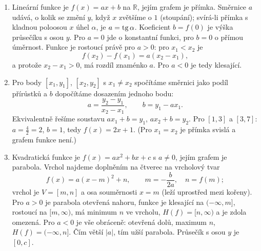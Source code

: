 \begin{enumerate}[label=\textbf{\arabic*.}, leftmargin=*, itemsep=0.8em]
  \item {}
  Lineární funkce je $f(x) = ax + b$ na $\mathbb{R}$, jejím grafem je přímka. Směrnice $a$ udává, o kolik se změní $y$, když $x$ zvětšíme o $1$ (stoupání); svírá-li přímka s kladnou poloosou $x$ úhel $\alpha$, je $a = \operatorname{tg}\alpha$. Koeficient $b = f(0)$ je výška průsečíku s osou $y$. Pro $a = 0$ jde o konstantní funkci, pro $b = 0$ o přímou úměrnost. Funkce je rostoucí právě pro $a > 0$: pro $x_1 < x_2$ je
  \begin{equation*}
    f(x_2) - f(x_1) = a(x_2 - x_1),
  \end{equation*}
  a protože $x_2 - x_1 > 0$, má rozdíl znaménko $a$. Pro $a < 0$ je tedy klesající. 

  \item {}
  Pro body $[x_1, y_1]$, $[x_2, y_2]$ s $x_1\neq x_2$ spočítáme směrnici jako podíl přírůstků a $b$ dopočítáme dosazením jednoho bodu:
  \begin{equation*}
    a = \frac{y_2 - y_1}{x_2 - x_1}, \qquad b = y_1 - ax_1.
  \end{equation*}
  Ekvivalentně řešíme soustavu $ax_1 + b = y_1$, $ax_2 + b = y_2$. Pro $[1, 3]$ a $[3, 7]$: $a = \frac{4}{2} = 2$, $b = 1$, tedy $f(x) = 2x + 1$. (Pro $x_1 = x_2$ je přímka svislá a grafem funkce není.) 

  \item {}
  Kvadratická funkce je $f(x) = ax^2 + bx + c$ s $a\neq 0$, jejím grafem je parabola. Vrchol najdeme doplněním na čtverec na vrcholový tvar
  \begin{equation*}
    f(x) = a{(x - m)}^2 + n, \qquad m = -\frac{b}{2a}, \quad n = f(m);
  \end{equation*}
  vrchol je $V = [m, n]$ a osa souměrnosti $x = m$ (leží uprostřed mezi kořeny). Pro $a > 0$ je parabola otevřená nahoru, funkce je klesající na $(-\infty, m]$, rostoucí na $[m, \infty)$, má minimum $n$ ve vrcholu, $H(f) = [n, \infty)$ a je zdola omezená. Pro $a < 0$ je vše obráceně: otevřená dolů, maximum $n$, $H(f) = (-\infty, n]$. Čím větší $|a|$, tím užší parabola. Průsečík s osou $y$ je $[0, c]$. 


\end{enumerate}
